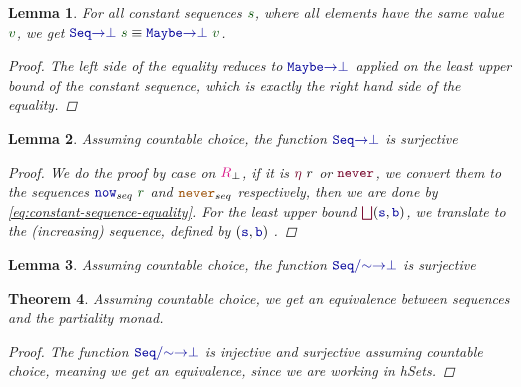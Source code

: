\documentclass[twoside,11pt,openright]{report}
\theoremstyle{plain} %
\newtheorem{thm}{Theorem}[section]
\newtheorem{lem}[thm]{Lemma}
\theoremstyle{definition}
\theoremstyle{remark}
\newcommand*{\term}[1]{\textcolor{green!30!black}{#1}} %
\newcommand*{\type}[1]{\textcolor{magenta!90!black}{#1}}
\newcommand*{\constant}[1]{\textcolor{orange!60!black}{\ensuremath{\mathtt{#1}}}}
\newcommand*{\function}[1]{\textcolor{blue!60!black}{\ensuremath{\mathtt{#1}}}}
\newcommand*{\constructor}[1]{\textcolor{purple!60!black}{\ensuremath{\mathtt{#1}}}}
\begin{document}
\begin{lem}
  \label{eq:constant-sequence-equality}
  For all constant sequences \(\term{s}\), where all elements have the same value \(\term{v}\), we get \(\function{Seq{\rightarrow}\bot}~\term{s} \equiv \function{Maybe{\rightarrow}\bot}~\term{v}\).
  \begin{proof}
    The left side of the equality reduces to \(\function{Maybe{\rightarrow}\bot}\) applied on the least upper bound of the constant sequence, which is exactly the right hand side of the equality.
  \end{proof}
\end{lem}
\begin{lem}
  Assuming countable choice, the function \(\function{Seq{\rightarrow}\bot}\) is surjective
  \begin{proof}
    We do the proof by case  on \(\type{R}_{\bot}\), if it is \(\constructor{\eta}~r\) or \(\constructor{never}\), we convert them to the sequences \(\function{now}_{seq}~\term{r}\) and \(\constant{never}_{seq}\) respectively, then we are done by \eqref{eq:constant-sequence-equality}. For the least upper bound \(\constructor{\bigsqcup} (\function{s},\function{b})\), we translate to the (increasing) sequence, defined by \((\function{s},\function{b})\) . 
  \end{proof}
\end{lem}
\begin{lem}
  Assuming countable choice, the function \(\function{Seq/{\sim}{\rightarrow}\bot}\) is surjective
  
\end{lem}
\begin{thm}
  Assuming countable choice, we get an equivalence between sequences and the partiality monad.
  \begin{proof}
 The function \(\function{Seq/{\sim}{\rightarrow}\bot}\) is injective and surjective assuming countable choice, meaning we get an equivalence, since we are working in hSets.
\end{proof}
\end{thm}
\end{document}
